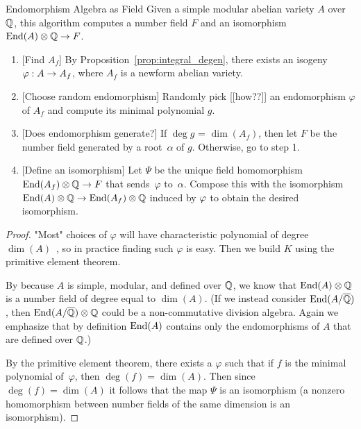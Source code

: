 \documentclass{article}
\begin{document}
\begin{algorithm}{Endomorphism Algebra as Field}
    \label{alg:end_as_field}
    Given a simple modular abelian variety $A$ over $\mathbb{Q}$,
    this algorithm computes a number field $F$ and an
    isomorphism $\operatorname{End}(A)\otimes\mathbb{Q} \to F$.
    \begin{enumerate}

        \item{} [Find $A_f$] By Proposition~\ref{prop:integral_degen}, there
            exists an isogeny $\varphi:A\to A_f$, where $A_f$ is a newform
            abelian variety.  
        \item{} [Choose random endomorphism] Randomly pick [[how??]] an endomorphism
            $\varphi$ of $A_f$ and compute its minimal polynomial $g$.
        \item{} [Does endomorphism generate?]
            If $\deg g$ = $\dim(A_f)$, then let $F$ be the
            number field generated by a root~$\alpha$ of $g$.
            Otherwise, go to step 1.
        \item{} [Define an isomorphism] Let $\Psi$ be the unique field
            homomorphism $\operatorname{End}(A_f)\otimes\mathbb{Q} \to F$ that sends~$\varphi$
            to~$\alpha$.  Compose this with the isomorphism
            $\operatorname{End}(A)\otimes\mathbb{Q} \to \operatorname{End}(A_f)\otimes\mathbb{Q}$ induced by $\varphi$
            to obtain the desired isomorphism.

    \end{enumerate}
\end{algorithm}
\begin{proof}
    "Most" choices of $\varphi$ will have characteristic polynomial of degree
    $\dim(A)$~\cite{primitive_element}, so in practice finding such $\varphi$
    is easy. Then we build $K$ using the primitive element theorem.

    By \cite[Theorem 2.1]{ribet:abelian_varieties} because $A$ is simple, modular, and
    defined over $\mathbb{Q}$, we know that $\operatorname{End}(A)\otimes\mathbb{Q}$ is a number field of
    degree equal to $\dim(A)$.  (If we instead consider $\operatorname{End}(A/\overline{\mathbb{Q}})$, then
    $\operatorname{End}(A/\overline{\mathbb{Q}})\otimes\mathbb{Q}$ could be a non-commutative division algebra.
    Again we emphasize that by definition $\operatorname{End}(A)$ contains only the
    endomorphisms of $A$ that are defined over $\mathbb{Q}$.)

    By the primitive element theorem, there exists a $\varphi$ such that
    if $f$ is the minimal polynomial of~$\varphi$, then
    $\deg(f) = \dim(A)$.
    Then since $\deg(f) = \dim(A)$ it follows that the
    map $\Psi$ is an isomorphism (a nonzero homomorphism between number
    fields of the same dimension is an isomorphism).
\end{proof}
\end{document}
